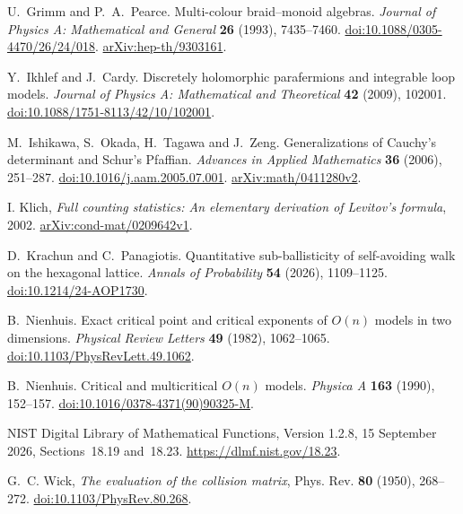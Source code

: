 U.~Grimm and P.~A.~Pearce.
Multi-colour braid--monoid algebras.
\emph{Journal of Physics A: Mathematical and General} \textbf{26} (1993), 7435--7460.
\href{https://doi.org/10.1088/0305-4470/26/24/018}{doi:10.1088/0305-4470/26/24/018}.
\href{https://arxiv.org/abs/hep-th/9303161}{arXiv:hep-th/9303161}.

Y.~Ikhlef and J.~Cardy. Discretely holomorphic parafermions and
integrable loop models. \emph{Journal of Physics A: Mathematical and
Theoretical} \textbf{42} (2009), 102001.
\href{https://doi.org/10.1088/1751-8113/42/10/102001}{doi:10.1088/1751-8113/42/10/102001}.

M.~Ishikawa, S.~Okada, H.~Tagawa and J.~Zeng.
Generalizations of Cauchy's determinant and Schur's Pfaffian.
\emph{Advances in Applied Mathematics} \textbf{36} (2006), 251--287.
\href{https://doi.org/10.1016/j.aam.2005.07.001}{doi:10.1016/j.aam.2005.07.001}.
\href{https://arxiv.org/abs/math/0411280v2}{arXiv:math/0411280v2}.

I. Klich,
\emph{Full counting statistics: An elementary derivation of Levitov's formula},
2002.
\href{https://arxiv.org/abs/cond-mat/0209642v1}{arXiv:cond-mat/0209642v1}.

D.~Krachun and C.~Panagiotis. Quantitative sub-ballisticity of
self-avoiding walk on the hexagonal lattice.
\emph{Annals of Probability} \textbf{54} (2026), 1109--1125.
\href{https://doi.org/10.1214/24-AOP1730}{doi:10.1214/24-AOP1730}.

B.~Nienhuis.
Exact critical point and critical exponents of $O(n)$ models in two dimensions.
\emph{Physical Review Letters} \textbf{49} (1982), 1062--1065.
\href{https://doi.org/10.1103/PhysRevLett.49.1062}{doi:10.1103/PhysRevLett.49.1062}.

B.~Nienhuis.
Critical and multicritical $O(n)$ models.
\emph{Physica A} \textbf{163} (1990), 152--157.
\href{https://doi.org/10.1016/0378-4371(90)90325-M}{doi:10.1016/0378-4371(90)90325-M}.


NIST Digital Library of Mathematical Functions,
Version 1.2.8, 15 September 2026,
Sections~18.19 and~18.23.
\url{https://dlmf.nist.gov/18.23}.

G.~C. Wick,
\emph{The evaluation of the collision matrix},
Phys. Rev. \textbf{80} (1950), 268--272.
\href{https://doi.org/10.1103/PhysRev.80.268}{doi:10.1103/PhysRev.80.268}.

